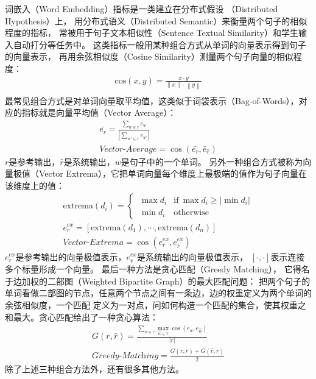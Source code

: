 词嵌入（Word Embedding）指标是一类建立在分布式假设
（Distributed Hypothesis）上，
用分布式语义（Distributed Semantic）来衡量两个句子的相似程度的指标，
常被用于句子文本相似性（Sentence Textual Similarity）和学生输入自动打分等任务中。
这类指标一般用某种组合方式从单词的向量表示得到句子的向量表示，
再用余弦相似度（Cosine Similarity）测量两个句子向量的相似程度：
\begin{align}
    \text{cos}(x, y) = \frac{x\cdot y}
    {\left\| x \right\| \cdot \left\| y \right\|} \\
\end{align}
最常见组合方式是对单词向量取平均值，这类似于词袋表示（Bag-of-Words），对应的指标就是向量平均值（Vector Average）：
\begin{align}
    \bar{e_r} = \frac{\sum_{w \in r} e_w}{|\sum_{w' \in r} e_{w'}|} \\
    \textit{Vector-Average} = \cos(\bar{e_r}, \bar{e}_{\hat{r}})
\end{align}
$r$是参考输出，$\hat{r}$是系统输出，$w$是句子中的一个单词。
另外一种组合方式被称为向量极值（Vector Extrema），它把单词向量每个维度上最极端的值作为句子向量在该维度上的值：
\begin{align}
    \text{extrema}(d_i) =
    \begin{cases}
        \ \max d_i & \text{if}\ \max d_i \geq |\min d_i| \\
        \ \min d_i & \text{otherwise}
    \end{cases} \\
    e_r^{ex} = [\text{extrema}(d_1), \cdots, \text{extrema}(d_n)] \\
    \textit{Vector-Extrema} = \cos( e_r^{ex}, e_{\hat{r}}^{ex} )
\end{align}
$e_r^{ex}$是参考输出的向量极值表示，$e_{\hat{r}}^{ex}$是系统输出的向量极值表示，
$[\cdot, \cdot]$表示连接多个标量形成一个向量。
最后一种方法是贪心匹配（Greedy Matching），
它得名于边加权的二部图（Weighted Bipartite Graph）的最大匹配问题：
把两个句子的单词看做二部图的节点，任意两个节点之间有一条边，边的权重定义为两个单词的余弦相似度，一个匹配
定义为一对点，问如何构造一个匹配的集合，使其权重之和最大。贪心匹配给出了一种贪心算法：
\begin{align}
    G(r, \hat{r}) = \frac{
    \sum_{w \in r} \max_{\hat{w} \in \hat{r}} \cos(e_w, e_{\hat{w}})
    }{ |r| } \\
    \textit{Greedy-Matching} = \frac{
    G(r, \hat{r}) + G(\hat{r}, r)
    }{2}
\end{align}
除了上述三种组合方法外，还有很多其他方法。

